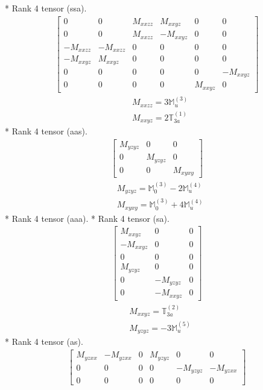 \documentclass[fleqn,8pt,landscape]{jsarticle}
\begin{document}
* Rank 4 tensor (ssa).
\begin{align*}
\begin{bmatrix} 0 & 0 & M_{xxzz} & M_{xxyz} & 0 & 0 \\ 0 & 0 & M_{xxzz} & - M_{xxyz} & 0 & 0 \\ - M_{xxzz} & - M_{xxzz} & 0 & 0 & 0 & 0 \\ - M_{xxyz} & M_{xxyz} & 0 & 0 & 0 & 0 \\ 0 & 0 & 0 & 0 & 0 & - M_{xxyz} \\ 0 & 0 & 0 & 0 & M_{xxyz} & 0 \end{bmatrix}
\end{align*}
\begin{align*}
& M_{xxzz} = 3 \mathbb{M}_{u}^{(3)} \\
& M_{xxyz} = 2 \mathbb{T}_{3a}^{(1)}
\end{align*}
* Rank 4 tensor (aas).
\begin{align*}
\begin{bmatrix} M_{yzyz} & 0 & 0 \\ 0 & M_{yzyz} & 0 \\ 0 & 0 & M_{xyxy} \end{bmatrix}
\end{align*}
\begin{align*}
& M_{yzyz} = \mathbb{M}_{0}^{(3)} - 2 \mathbb{M}_{u}^{(4)} \\
& M_{xyxy} = \mathbb{M}_{0}^{(3)} + 4 \mathbb{M}_{u}^{(4)}
\end{align*}
* Rank 4 tensor (aaa).
* Rank 4 tensor (sa).
\begin{align*}
\begin{bmatrix} M_{xxyz} & 0 & 0 \\ - M_{xxyz} & 0 & 0 \\ 0 & 0 & 0 \\ M_{yzyz} & 0 & 0 \\ 0 & - M_{yzyz} & 0 \\ 0 & - M_{xxyz} & 0 \end{bmatrix}
\end{align*}
\begin{align*}
& M_{xxyz} = \mathbb{T}_{3a}^{(2)} \\
& M_{yzyz} = - 3 \mathbb{M}_{u}^{(5)}
\end{align*}
* Rank 4 tensor (as).
\begin{align*}
\begin{bmatrix} M_{yzxx} & - M_{yzxx} & 0 & M_{yzyz} & 0 & 0 \\ 0 & 0 & 0 & 0 & - M_{yzyz} & - M_{yzxx} \\ 0 & 0 & 0 & 0 & 0 & 0 \end{bmatrix}
\end{align*}
\end{document}
